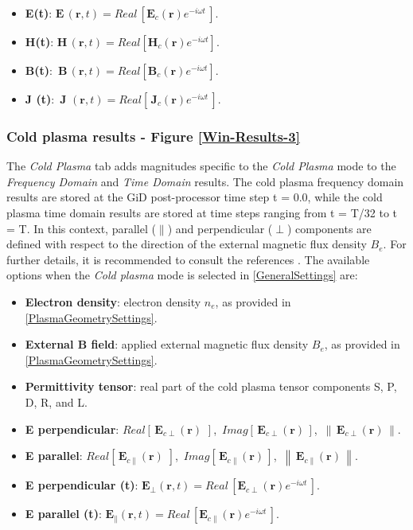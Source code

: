 \begin{itemize}\itemsep0em 
	\item \textbf{E(t)}: $\mathbf{E}\,(\mathbf{r},t) = Real\,\left[\mathbf{E}_{c}(\mathbf{r})e^{-i\omega t}\,\right]$.
	\quad
	\item \textbf{H(t)}: $\mathbf{H}\,(\mathbf{r},t) = Real\left[\mathbf{H}_{c}(\mathbf{r})e^{-i\omega t}\right]$.
	\quad
	\item \textbf{B(t)}: \,$\mathbf{B}\,(\mathbf{r},t) = Real\left[\mathbf{B}_{c}(\mathbf{r})e^{-i\omega t}\right]$.
	\quad
	\item \textbf{J (t)}: \,$\mathbf{J}\,\,(\mathbf{r},t) = Real\left[\,\mathbf{J}_{c}(\mathbf{r})e^{-i\omega t}\,\right]$.
\end{itemize}

\subsubsection{Cold plasma results - Figure \ref{Win-Results-3}}

The \textit{Cold Plasma} tab adds magnitudes specific to the \textit{Cold Plasma} mode to the \textit{Frequency Domain} and \textit{Time Domain} results. The cold plasma frequency domain results are stored at the GiD post-processor time step t = 0.0, while the cold plasma time domain results are stored at time steps ranging from t = T/32 to t = T. In this context, parallel ($\parallel$) and perpendicular ($\perp$) components are defined with respect to the direction of the external magnetic flux density $B_{e}$. For further details, it is recommended to consult the references \cite{Swanson, Stix}. The available options when the \textit{Cold plasma} mode is selected in \ref{GeneralSettings} are:

\begin{itemize}\itemsep0em 
	\item \textbf{Electron density}: electron density $n_{e}$, as provided in \ref{PlasmaGeometrySettings}.
	\quad
	\item \textbf{External B field}: applied external magnetic flux density $B_{e}$, as provided in \ref{PlasmaGeometrySettings}.
	\quad
	\item \textbf{Permittivity tensor}: real part of the cold plasma tensor components S, P, D, R, and L.
	\quad
	\item \textbf{E perpendicular}: $Real\left[\,\mathbf{E}_{c\perp}(\mathbf{r})\,\,\right]$, $\,Imag\left[\,\mathbf{E}_{c\perp}(\mathbf{r})\,\right]$, $\,\left\|\,\mathbf{E}_{c\perp}(\mathbf{r})\,\right\|$.
	\quad
	\item \textbf{E parallel}: $Real\left[\,\mathbf{E}_{c\parallel}(\mathbf{r})\,\,\right]$, $\,Imag\left[\,\mathbf{E}_{c\parallel}(\mathbf{r})\,\right]$, $\,\left\|\,\mathbf{E}_{c\parallel}(\mathbf{r})\,\right\|$.
	\quad
	\item \textbf{E perpendicular (t)}: $\mathbf{E}_{\perp}(\mathbf{r},t) = Real\,\left[\mathbf{E}_{c\perp}(\mathbf{r})e^{-i\omega t}\,\right]$.
	\quad
	\item \textbf{E parallel (t)}: $\mathbf{E}_{\parallel}(\mathbf{r},t) = Real\,\left[\mathbf{E}_{c\parallel}(\mathbf{r})e^{-i\omega t}\,\right]$.
\end{itemize}

